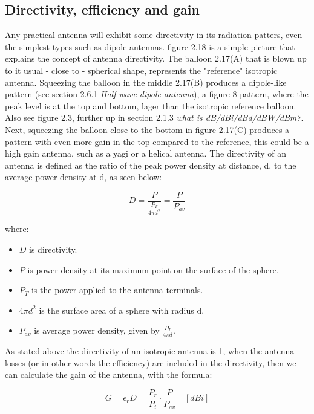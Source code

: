 \subsection{Directivity, efficiency and gain}
Any practical antenna will exhibit some directivity in its radiation patters, even the simplest types such as dipole antennas. figure 2.18 is a simple picture that explains the concept of antenna directivity. The balloon 2.17(A) that is blown up to it usual - close to - spherical shape, represents the "reference" isotropic antenna. Squeezing the balloon in the middle 2.17(B) produces a dipole-like pattern (see section 2.6.1 \textit{Half-wave dipole antenna}), a figure 8 pattern, where the peak level is at the top and bottom, lager than the isotropic reference balloon. Also see figure 2.3, further up in section 2.1.3 \textit{what is dB/dBi/dBd/dBW/dBm?}. Next, squeezing the balloon close to the bottom in figure 2.17(C) produces a pattern with even more gain in the top compared to the reference, this could be a high gain antenna, such as a yagi or a helical antenna. The directivity of an antenna is defined as the ratio of the peak power density at distance, d, to the average power density at d, as seen below:  

\begin{equation}
    D = \frac{P}{\frac{P_T}{4 \pi d^2}} = \frac{P}{P_{av}} 
\end{equation}

where:

\begin{itemize}
  \item $D$ is directivity.
  \item $P$ is power density at its maximum point on the surface of the sphere.
  \item $P_T$ is the power applied to the antenna terminals.
  \item $4 \pi d^2$ is the surface area of a sphere with radius d.
  \item $P_{av}$ is average power density, given by $\frac{P_T}{4 \pi d}$.
\end{itemize}

As stated above the directivity of an isotropic antenna is 1, when the antenna losses (or in other words the efficiency) are included in the directivity, then we can calculate the gain of the antenna, with the formula:

\begin{equation}
    G = \epsilon_r D = \frac{P_r}{P_i}\cdot\frac{P}{P_{av}} \quad [dBi]
\end{equation}

